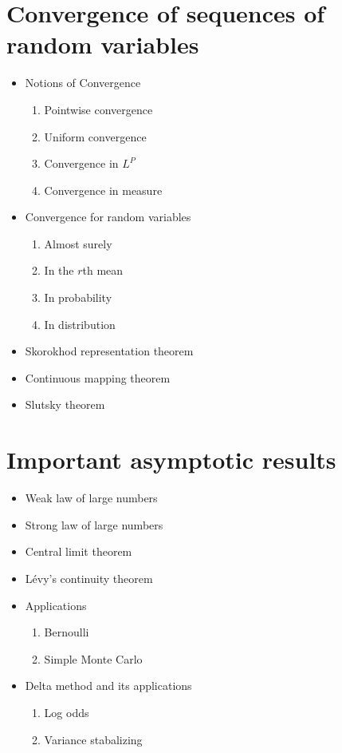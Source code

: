 \section{Convergence of sequences of random variables}

\begin{itemize}
    \item Notions of Convergence
        \begin{enumerate}
            \item Pointwise convergence
            \item Uniform convergence
            \item Convergence in $L^P$
            \item Convergence in measure
        \end{enumerate}
    \item Convergence for random variables
        \begin{enumerate}
            \item Almost surely
            \item In the $r$th mean
            \item In probability
            \item In distribution
        \end{enumerate}
    \item Skorokhod representation theorem
    \item Continuous mapping theorem
    \item Slutsky theorem
\end{itemize}

\section{Important asymptotic results}

\begin{itemize}
    \item Weak law of large numbers
    \item Strong law of large numbers
    \item Central limit theorem
    \item Lévy's continuity theorem
    \item Applications
        \begin{enumerate}
            \item Bernoulli
            \item Simple Monte Carlo
        \end{enumerate}
    \item Delta method and its applications
        \begin{enumerate}
            \item Log odds
            \item Variance stabalizing
        \end{enumerate}
\end{itemize}